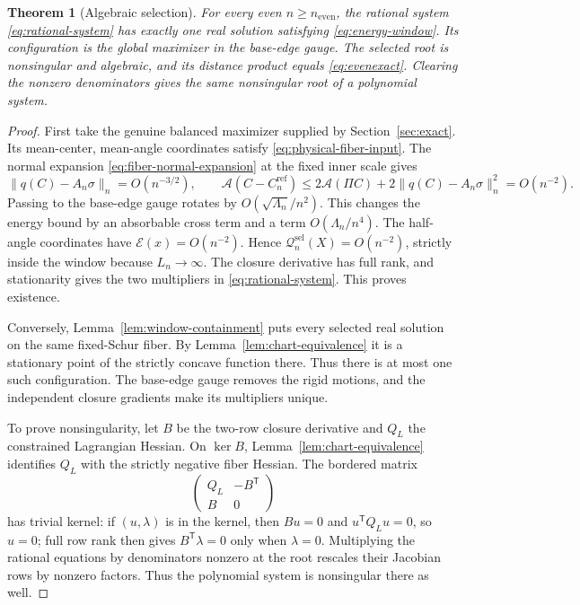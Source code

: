 \documentclass[11pt,reqno]{amsart}
\numberwithin{equation}{section}
\newtheorem{theorem}{Theorem}[section]
\theoremstyle{definition}
\theoremstyle{remark}
\newcommand{\A}{\mathcal A}
\newcommand{\E}{\mathcal E}
\newcommand{\norm}[1]{\lVert #1\rVert}
\begin{document}
\begin{theorem}[Algebraic selection]\label{prop:algebraic-selection}
For every even $n\ge n_{\mathrm{even}}$, the rational system \eqref{eq:rational-system} has exactly one real solution satisfying \eqref{eq:energy-window}. Its configuration is the global maximizer in the base-edge gauge. The selected root is nonsingular and algebraic, and its distance product equals \eqref{eq:evenexact}. Clearing the nonzero denominators gives the same nonsingular root of a polynomial system.
\end{theorem}
\begin{proof}
First take the genuine balanced maximizer supplied by Section~\ref{sec:exact}. Its mean-center, mean-angle coordinates satisfy \eqref{eq:physical-fiber-input}. The normal expansion \eqref{eq:fiber-normal-expansion} at the fixed inner scale gives
\[
 \norm{q(C)-A_n\sigma}_n=O(n^{-3/2}),\qquad
 \A(C-C_n^{\mathrm{ref}})
 \le2\A(\Pi C)+2\norm{q(C)-A_n\sigma}_n^2=O(n^{-2}).
\]
Passing to the base-edge gauge rotates by $O(\sqrt{\Lambda_n}/n^2)$. This changes the energy bound by an absorbable cross term and a term $O(\Lambda_n/n^4)$. The half-angle coordinates have $\E(x)=O(n^{-2})$. Hence
$\mathcal Q_n^{\mathrm{sel}}(X)=O(n^{-2})$, strictly inside the window because $L_n\to\infty$. The closure derivative has full rank, and stationarity gives the two multipliers in \eqref{eq:rational-system}. This proves existence.

Conversely, Lemma~\ref{lem:window-containment} puts every selected real solution on the same fixed-Schur fiber. By Lemma~\ref{lem:chart-equivalence} it is a stationary point of the strictly concave function there. Thus there is at most one such configuration. The base-edge gauge removes the rigid motions, and the independent closure gradients make its multipliers unique.

To prove nonsingularity, let $B$ be the two-row closure derivative and $Q_L$ the constrained Lagrangian Hessian. On $\ker B$, Lemma~\ref{lem:chart-equivalence} identifies $Q_L$ with the strictly negative fiber Hessian. The bordered matrix
\[
 \begin{pmatrix}Q_L&-B^{\mathsf T}\\ B&0\end{pmatrix}
\]
has trivial kernel: if $(u,\lambda)$ is in the kernel, then $Bu=0$ and
$u^{\mathsf T}Q_Lu=0$, so $u=0$; full row rank then gives
$B^{\mathsf T}\lambda=0$ only when $\lambda=0$.
Multiplying the rational equations by denominators nonzero at the root rescales their Jacobian rows by nonzero factors. Thus the polynomial system is nonsingular there as well.


\end{proof}
\end{document}
